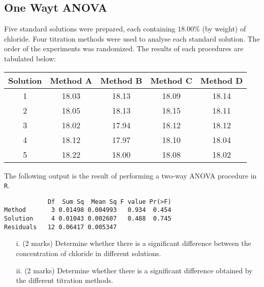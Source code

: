 \subsection{One Wayt ANOVA}
Five standard solutions were prepared, each containing $18.00\%$ (by weight) of chloride. Four titration methods were used to analyse each standard solution. The order of the experiments was randomized. The results of each procedures are tabulated below:
\begin{center}
    \begin{tabular}{|c|c|c|c|c|}
      \hline

      Solution &  Method A & Method B & Method C & Method D \\\hline
1	&	18.03	&	18.13	&	18.09	&	18.14	\\
2	&	18.05	&	18.13	&	18.15	&	18.11	\\
3	&	18.02	&	17.94	&	18.12	&	18.12	\\
4	&	18.12	&	17.97	&	18.10	&	18.04	\\
5	&	18.22	&	18.00	&	18.08	&	18.02	\\

      \hline
    \end{tabular}
    \end{center}
The following output is the result of performing a two-way ANOVA procedure in \texttt{R}.
\begin{framed}
\begin{verbatim}
            Df  Sum Sq  Mean Sq F value Pr(>F)
Method       3 0.01498 0.004993   0.934  0.454
Solution     4 0.01043 0.002607   0.488  0.745
Residuals   12 0.06417 0.005347
\end{verbatim}
\end{framed}




\begin{itemize}
\item[i.] (2 marks) Determine whether there is a significant difference between the concentration of chloride in different solutions.
\item[ii.] (2 marks) Determine whether there is a  significant difference obtained by the different titration methods.
\end{itemize}


